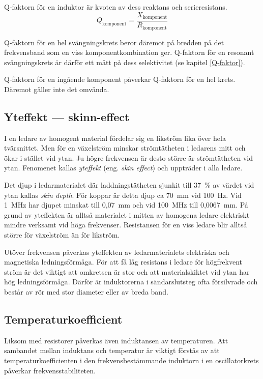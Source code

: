 Q-faktorn för en induktor är kvoten av dess reaktans och serieresistans.
\[ Q_\text{komponent} = \dfrac{X_\text{komponent}}{R_\text{komponent}} \]

Q-faktorn för en hel svängningskrets beror däremot på bredden på det
frekvensband som en viss komponentkombination ger.
Q-faktorn för en resonant svängningskrets är därför ett mått på dess
selektivitet (se kapitel \ref{Q-faktor}).

Q-faktorn för en ingående komponent påverkar Q-faktorn för en hel krets.
Däremot gäller inte det omvända.

\subsection{Yteffekt --- skinn-effect}

I en ledare av homogent material fördelar sig en likström lika över hela
tvärsnittet. Men för en växelström minskar strömtätheten i ledarens mitt
och ökar i stället vid ytan.
Ju högre frekvensen är desto större är strömtätheten vid ytan.
Fenomenet kallas \emph{yteffekt} (eng. \emph{skin effect}) och uppträder i alla
ledare.

Det djup i ledarmaterialet där laddningstätheten sjunkit till 37~\% av
värdet vid ytan kallas \emph{skin depth}. För koppar är detta djup ca 70~mm vid
100~Hz. Vid 1~MHz har djupet minskat till 0,07~mm och vid 100~MHz till
0,0067~mm. På grund av yteffekten är alltså materialet i mitten av homogena
ledare elektriskt mindre verksamt vid höga frekvenser. Resistansen för en viss ledare 
blir alltså större för växelström än för likström.

Utöver frekvensen påverkas yteffekten av ledarmaterialets elektriska och
magnetiska ledningsförmåga. För att få låg resistans i ledare för högfrekvent
ström är det viktigt att omkretsen är stor och att materialskiktet vid ytan har
hög ledningsförmåga. Därför är induktorerna i sändarslutsteg ofta 
försilvrade och består av rör med stor diameter eller av breda band.

\subsection{Temperaturkoefficient}

Liksom med resistorer påverkas även induktansen av temperaturen. Att sambandet
mellan induktans och temperatur är viktigt förstås av att
temperaturkoefficienten i den frekvensbestämmande induktorn i en oscillatorkrets
påverkar frekvensstabiliteten.

